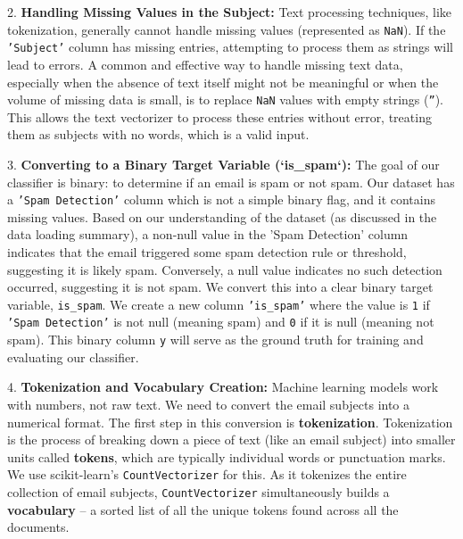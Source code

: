 \documentclass[12pt,a4paper]{article}
\begin{document}
2.  \textbf{Handling Missing Values in the Subject:} Text processing techniques, like tokenization, generally cannot handle missing values (represented as \texttt{NaN}). If the \texttt{'Subject'} column has missing entries, attempting to process them as strings will lead to errors. A common and effective way to handle missing text data, especially when the absence of text itself might not be meaningful or when the volume of missing data is small, is to replace \texttt{NaN} values with empty strings (\texttt{''}). This allows the text vectorizer to process these entries without error, treating them as subjects with no words, which is a valid input.

3.  \textbf{Converting to a Binary Target Variable (`is\_spam`):} The goal of our classifier is binary: to determine if an email is spam or not spam. Our dataset has a \texttt{'Spam Detection'} column which is not a simple binary flag, and it contains missing values. Based on our understanding of the dataset (as discussed in the data loading summary), a non-null value in the 'Spam Detection' column indicates that the email triggered some spam detection rule or threshold, suggesting it is likely spam. Conversely, a null value indicates no such detection occurred, suggesting it is not spam. We convert this into a clear binary target variable, \texttt{is\_spam}. We create a new column \texttt{'is\_spam'} where the value is \texttt{1} if \texttt{'Spam Detection'} is not null (meaning spam) and \texttt{0} if it is null (meaning not spam). This binary column \texttt{y} will serve as the ground truth for training and evaluating our classifier.

4.  \textbf{Tokenization and Vocabulary Creation:} Machine learning models work with numbers, not raw text. We need to convert the email subjects into a numerical format. The first step in this conversion is \textbf{tokenization}. Tokenization is the process of breaking down a piece of text (like an email subject) into smaller units called \textbf{tokens}, which are typically individual words or punctuation marks. We use scikit-learn's \texttt{CountVectorizer} for this. As it tokenizes the entire collection of email subjects, \texttt{CountVectorizer} simultaneously builds a \textbf{vocabulary} – a sorted list of all the unique tokens found across all the documents.
\end{document}
